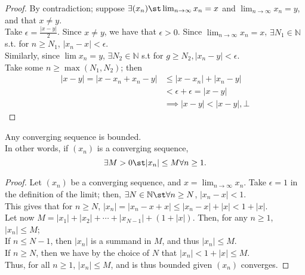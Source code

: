\documentclass[12pt]{article}
\begin{document}
\begin{proof}
  By contradiction; suppose $\exists (x_n) \st \lim_{n \to \infty} x_n = x$ and $\lim_{n \to \infty} x_n = y$, and that $x \neq y$.\\
  Take $\epsilon = \frac{|x-y|}{2}$. Since $x \neq y$, we have that $\epsilon > 0$. Since $\lim_{n \to \infty} x_n = x$, $\exists N_1 \in \mathbb{N}$ s.t. for $n \geq N_1$, $|x_n - x| < \epsilon$. \\
  Similarly,  since $\lim x_n = y$, $\exists N_2 \in \mathbb{N}$ s.t for $g \geq N_2, |x_n - y| < \epsilon$. \\
  Take some $n \geq \max(N_1, N_2)$; then \begin{align*}
    |x-y| = |x-x_n + x_n - y| &\leq |x-x_n|+|x_n-y|\\
    &< \epsilon + \epsilon = |x-y|\\
    &\implies |x-y| < |x-y|, \bot
  \end{align*}
\end{proof}

\begin{theorem}\label{thm:convbound}
  Any converging sequence is bounded.\footnotemark\\In other words, if $(x_n)$ is a converging sequence, $$\exists M > 0 \st |x_n| \leq M \forall n \geq 1.$$
\end{theorem}



\begin{proof}
  Let $(x_n)$ be a converging sequence, and $x = \lim_{n\to\infty} x_n$. Take $\epsilon = 1$ in the definition of the limit; then, $\exists N \in \mathbb{N} \st \forall n \geq N$, $|x_n - x| < 1$.\\
  This gives that for $n \geq N$, $|x_n| = |x_n - x + x| \leq |x_n - x| + |x| < 1 + |x|$.\\
  Let now $M = |x_1| + |x_2| + \cdots + |x_{N-1}| + (1 + |x|)$. Then, for any $n \geq 1$, $|x_n| \leq M$;\\If $n \leq N-1$, then $|x_n|$ is a summand in $M$, and thus $|x_n| \leq M$.\\ If $n \geq N$, then we have by the choice of $N$ that $|x_n| < 1 + |x| \leq M$.\\ Thus, for all $n \geq 1$, $|x_n| \leq M$, and is thus bounded given $(x_n)$ converges.
\end{proof}
\end{document}
